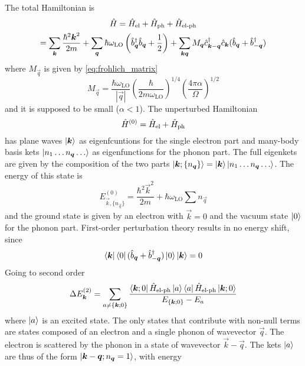 The total Hamiltonian is
\begin{multline}
    \hat{H} = \hat{H}_\text{el} + \hat{H}_\text{ph} + \hat{H}_\text{el-ph}
    \\ = \sum_{\mathbf{\boldsymbol{k}}} \frac{\hbar^2\mathbf{\boldsymbol{k}}^2}{2m}
    + \sum_{\mathbf{\boldsymbol{q}}} \hbar \omega_\text{LO} \left( \hat{b}^\dagger_{ \mathbf{\boldsymbol{q}}} \hat{b}_{ \mathbf{\boldsymbol{q}}} + \frac{1}{2} \right)
    + \sum_{\mathbf{\boldsymbol{k}}\mathbf{\boldsymbol{q}}} M_{\mathbf{\boldsymbol{q}}}\hat{c}^\dagger_{\mathbf{\boldsymbol{k}}-\mathbf{\boldsymbol{q}}}\hat{c}_{\mathbf{\boldsymbol{k}}} (\hat{b}_{\mathbf{\boldsymbol{q}}} + \hat{b}^\dagger_{-\mathbf{\boldsymbol{q}}})
\end{multline}
where $M_\vec{q}$ is given by \cref{eq:frohlich_matrix}
\begin{equation} \label{eq:frohlich_matrix_perturbation}
    M_\vec{q} =  \frac{\hbar \omega_\text{LO}}{|\vec{q}|} \left(\frac{\hbar}{2m\omega_\text{LO}}\right)^{1/4} \left(\frac{4\pi\alpha}{\Omega}\right)^{1/2}
\end{equation}
and it is supposed to be small ($\alpha < 1$). The unperturbed Hamiltonian
\begin{equation}
    \hat{H}^{(0)} = \hat{H}_\text{el} + \hat{H}_\text{ph}
\end{equation}
has plane waves $\ket{\mathbf{\boldsymbol{k}}}$ as eigenfcuntions for the single  electron part and many-body basis kets $\ket{n_1 \dots n_{\mathbf{\boldsymbol{q}}} \dots}$ as eigenfunctions for the phonon part. The full eigenkets are given by the composition of the two parts $\ket{\mathbf{\boldsymbol{k}}; \{n_{\mathbf{\boldsymbol{q}}}\}} = \ket{\mathbf{\boldsymbol{k}}}\ket{n_1 \dots n_{\mathbf{\boldsymbol{q}}} \dots}$. The energy of this state is
\begin{equation}
    E_{\vec{k}, \{n_\vec{q}\}}^{(0)} = \frac{\hbar^2\vec{k}^2}{2m} + \hbar \omega_\text{LO}\sum n_\vec{q}
\end{equation}
and the ground state is given by an electron with $\vec{k}=0$ and the vacuum state $\ket{0}$ for the phonon part.
First-order perturbation theory results in no energy shift, since
\begin{equation}
    \bra{\mathbf{\boldsymbol{k}}}\bra{0}(\hat{b}_{\mathbf{\boldsymbol{q}}} + \hat{b}^\dagger_{-\mathbf{\boldsymbol{q}}})\ket{0}\ket{\mathbf{\boldsymbol{k}}} = 0
\end{equation}
Going to second order
\begin{equation}
    \Delta E_{\mathbf{\boldsymbol{k}}}^{(2)} = \sum_{a\neq{\{\mathbf{\boldsymbol{k}};0\}}} \frac{\bra{\mathbf{\boldsymbol{k}};0}\hat{H}_\text{el-ph}\ket{a}\bra{a}\hat{H}_\text{el-ph}\ket{\mathbf{\boldsymbol{k}};0}}{E_{\{\mathbf{\boldsymbol{k}};0\}} - E_a}
\end{equation}
where $\ket{a}$ is an excited state. The only states that contribute with non-null terms are states composed of an electron and a single phonon of wavevector $\vec{q}$. The electron is scattered by the phonon in a state of wavevector $\vec{k} - \vec{q}$. The kets $\ket{a}$ are thus of the form $\ket{\mathbf{\boldsymbol{k}}-\mathbf{\boldsymbol{q}}; n_{\mathbf{\boldsymbol{q}}}=1}$, with energy
